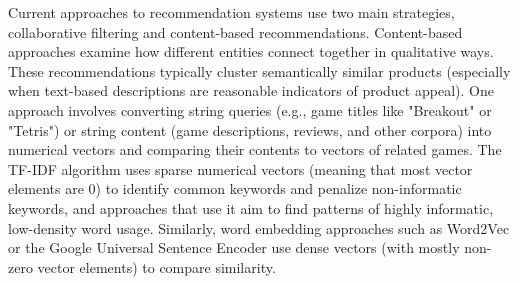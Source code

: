 \documentclass[10pt,twocolumn]{article}
\begin{document}
\begin{comment}
        DEFINE word embeddings

        Sundermann: - cited

        Use contextual information in addition to conventional aspects of user profiles and content-based filtering. context of items (products) and reviews using text mining/word embedding representations

        Proposes contextual information extraction tool from documents of product info/recommendations

        Nguyen: - cited

        Help alleviate the cold start problem by using word embedding content analysis of free-text input in conjunction with collaborative filtering; perform topic modeling using word embedding representations and use topics for cosine similarity recommendation
    
        Word embeddings - Sundermann et al. and Nguyen et al.
\end{comment}

Current approaches to recommendation systems use two main strategies, collaborative filtering and content-based recommendations. Content-based approaches examine how different entities connect together in qualitative ways. These recommendations typically cluster semantically similar products (especially when text-based descriptions are reasonable indicators of product appeal). One approach involves converting string queries (e.g., game titles like "Breakout" or "Tetris") or string content (game descriptions, reviews, and other corpora) into numerical vectors and comparing their contents to vectors of related games. The TF-IDF algorithm uses sparse numerical vectors (meaning that most vector elements are 0) to identify common keywords and penalize non-informatic keywords, and approaches that use it aim to find patterns of highly informatic, low-density word usage. \cite{Meidl, Zhang, DWang} Similarly, word embedding approaches such as Word2Vec \cite{Word2Vec} or the Google Universal Sentence Encoder \cite{SentenceEncoder} use dense vectors (with mostly non-zero vector elements) to compare similarity.
\end{document}

